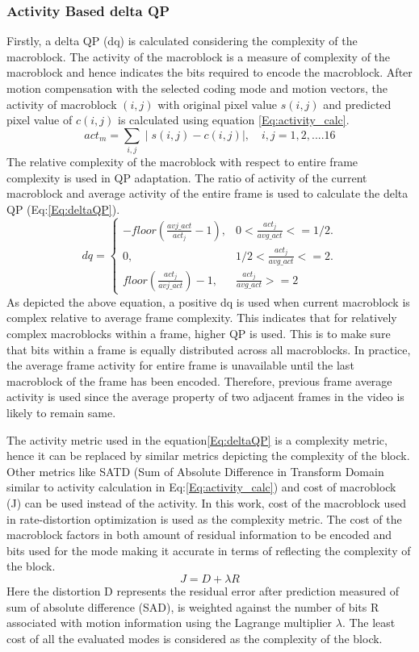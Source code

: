 \documentclass[11pt]{article} %
\begin{document}
\subsubsection{Activity Based delta QP}	
	Firstly, a delta QP (dq) is calculated considering the complexity of the macroblock. The activity of the macroblock is a measure of complexity of the macroblock and hence indicates the bits required to encode the macroblock. After motion compensation with the selected coding mode and motion vectors, the activity of macroblock $(i,j)$ with original pixel value $s(i,j)$ and predicted pixel value of $c(i,j)$ is calculated using equation \ref{Eq:activity_calc}. 
\begin{equation}
	\label{Eq:activity_calc}
	act_m = \sum_{i,j} \mid s(i,j)-c(i,j) \mid ,\quad	i,j = 1,2,....16
\end{equation}	
	 The relative complexity of the macroblock with respect to entire frame complexity is used in QP adaptation. The ratio of activity of the current macroblock and  average activity of the entire frame is used to calculate the delta QP (Eq:\ref{Eq:deltaQP}).
\begin{equation}
	\label{Eq:deltaQP}
	dq = \begin{cases}
		-floor(\frac{avj\_act} {act_j} - 1), &  0 < \frac{act_j}{avg\_act} <= 1/2.\\
		0, & 1/2 < \frac{act_j}{avg\_act} <= 2.\\
		floor(\frac{act_j} {avj\_act}) - 1, & \frac{act_j}{avg\_act} >= 2
	\end{cases}
\end{equation}
As depicted the above equation, a positive dq is used when current macroblock is complex relative to average frame complexity. This indicates that for relatively complex macroblocks within a frame, higher QP is used. This is to make sure that bits within a frame is equally distributed across all macroblocks. In practice, the average frame activity for entire frame is unavailable until the last macroblock of the frame has been encoded. Therefore, previous frame average activity is used since the average property of two adjacent frames in the video is likely to remain same. 

The activity metric used in the equation\ref{Eq:deltaQP} is a complexity metric, hence it can be replaced by similar metrics depicting the complexity of the block. Other metrics like SATD (Sum of Absolute Difference in Transform Domain similar to activity calculation in Eq:\ref{Eq:activity_calc}) and cost of macroblock (J) can be used instead of the activity. In this work, cost of the macroblock used in rate-distortion optimization is used as the complexity metric. The cost of the macroblock factors in both amount of residual information to be encoded and bits used for the mode making it accurate in terms of reflecting the complexity of the block.
 \begin{equation}
	\label{Eq:CostCalc}
		J = D + \lambda R
\end{equation}
Here the distortion D represents the residual error after prediction measured of sum of absolute difference (SAD), is weighted against the number of bits R associated with motion information using the Lagrange multiplier $\lambda$. The least cost of all the evaluated modes is considered as the complexity of the block.
\end{document}
